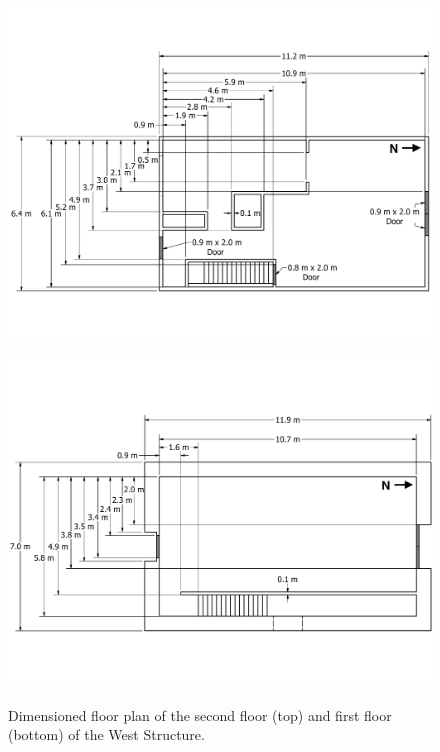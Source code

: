 \documentclass[12pt,oneside]{book}
\begin{document}
\begin{figure}[!ht]
	\includegraphics[width=\columnwidth]{..//Figures/Floor_Plans/West_Structure_2nd_Floor_Dimensioned_Full}
	\\~\\
	\includegraphics[width=\columnwidth]{../Figures/Floor_Plans/West_Structure_1st_Floor_Dimensioned_Full}
	\caption[Dimensioned floor plan of the first and second floors of the West Structure.]{Dimensioned floor plan of the second floor (top) and first floor (bottom) of the West Structure.}
	\label{fig:west_dimensioned_plan}
\end{figure}
\end{document}
